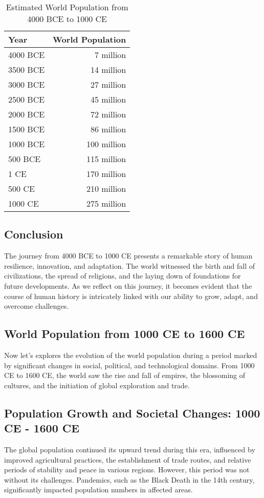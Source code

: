 \documentclass[a4paper,12pt]{book}
\begin{document}
\begin{table}[h!]
\centering
\begin{tabular}{|l|r|}
\hline
Year & World Population \\
\hline
4000 BCE & 7 million \\
3500 BCE & 14 million \\
3000 BCE & 27 million \\
2500 BCE & 45 million \\
2000 BCE & 72 million \\
1500 BCE & 86 million \\
1000 BCE & 100 million \\
500 BCE & 115 million \\
1 CE & 170 million \\
500 CE & 210 million \\
1000 CE & 275 million \\
\hline
\end{tabular}
\caption{Estimated World Population from 4000 BCE to 1000 CE}
\label{tab:world_population}
\end{table}

\subsection*{Conclusion}
The journey from 4000 BCE to 1000 CE presents a remarkable story of human resilience, innovation, and adaptation. The world witnessed the birth and fall of civilizations, the spread of religions, and the laying down of foundations for future developments. As we reflect on this journey, it becomes evident that the course of human history is intricately linked with our ability to grow, adapt, and overcome challenges.

\subsection*{World Population from 1000 CE to 1600 CE}
Now let's explores the evolution of the world population during a period marked by significant changes in social, political, and technological domains. From 1000 CE to 1600 CE, the world saw the rise and fall of empires, the blossoming of cultures, and the initiation of global exploration and trade.

\subsection*{Population Growth and Societal Changes: 1000 CE - 1600 CE}
The global population continued its upward trend during this era, influenced by improved agricultural practices, the establishment of trade routes, and relative periods of stability and peace in various regions. However, this period was not without its challenges. Pandemics, such as the Black Death in the 14th century, significantly impacted population numbers in affected areas.
\end{document}
